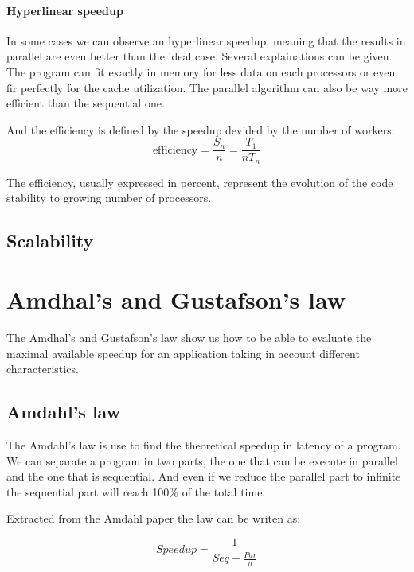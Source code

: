 \paragraph{Hyperlinear speedup}
In some cases we can observe an hyperlinear speedup, meaning that the results in parallel are even better than the ideal case. 
Several explainations can be given. 
The program can fit exactly in memory for less data on each processors or even fir perfectly for the cache utilization. 
The parallel algorithm can also be way more efficient than the sequential one. 

And the efficiency is defined by the speedup devided by the number of workers: 
\begin{equation}
\text{efficiency} = \frac{S_n}{n} = \frac{T_1}{nT_n}
\end{equation}

The efficiency, usually expressed in percent, represent the evolution of the code stability to growing number of processors. 


\subsection{Scalability}

\section{Amdhal's and Gustafson's law}

The Amdhal's and Gustafson's law show us how to be able to evaluate the maximal available speedup for an application taking in account different characteristics. 

\subsection{Amdahl's law}

The Amdahl's law\cite{amdahl1967validity} is use to find the theoretical speedup in latency of a program.
We can separate a program in two parts, the one that can be execute in parallel and the one that is sequential. 
And even if we reduce the parallel part to infinite the sequential part will reach 100\% of the total time. 

Extracted from the Amdahl paper the law can be writen as: 

\begin{equation}
Speedup = \frac{1}{Seq + \frac{Par}{n}}
\end{equation}

